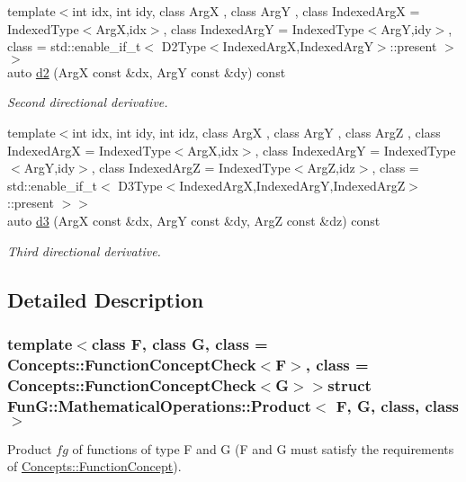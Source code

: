 \begin{DoxyCompactItemize}
{\footnotesize template$<$int idx, int idy, class Arg\-X , class Arg\-Y , class Indexed\-Arg\-X  = \-Indexed\-Type$<$\-Arg\-X,idx$>$, class Indexed\-Arg\-Y  = \-Indexed\-Type$<$\-Arg\-Y,idy$>$, class  = std\-::enable\-\_\-if\-\_\-t$<$ D2\-Type$<$\-Indexed\-Arg\-X,\-Indexed\-Arg\-Y$>$\-::present $>$$>$ }\\auto \hyperlink{structFunG_1_1MathematicalOperations_1_1Product_a91802ff95963324b5f36016ac5f8c5e0}{d2} (\-Arg\-X const \&dx, \-Arg\-Y const \&dy) const 
\begin{DoxyCompactList}\small\item\em \-Second directional derivative. \end{DoxyCompactList}\item 
{\footnotesize template$<$int idx, int idy, int idz, class Arg\-X , class Arg\-Y , class Arg\-Z , class Indexed\-Arg\-X  = \-Indexed\-Type$<$\-Arg\-X,idx$>$, class Indexed\-Arg\-Y  = \-Indexed\-Type$<$\-Arg\-Y,idy$>$, class Indexed\-Arg\-Z  = \-Indexed\-Type$<$\-Arg\-Z,idz$>$, class  = std\-::enable\-\_\-if\-\_\-t$<$ D3\-Type$<$\-Indexed\-Arg\-X,\-Indexed\-Arg\-Y,\-Indexed\-Arg\-Z$>$\-::present $>$$>$ }\\auto \hyperlink{structFunG_1_1MathematicalOperations_1_1Product_a1ba58e174ea3864a63a4158b95fc8db0}{d3} (\-Arg\-X const \&dx, \-Arg\-Y const \&dy, \-Arg\-Z const \&dz) const 
\begin{DoxyCompactList}\small\item\em \-Third directional derivative. \end{DoxyCompactList}\end{DoxyCompactItemize}


\subsection{\-Detailed \-Description}
\subsubsection*{template$<$class F, class G, class = \-Concepts\-::\-Function\-Concept\-Check$<$\-F$>$, class = \-Concepts\-::\-Function\-Concept\-Check$<$\-G$>$$>$struct Fun\-G\-::\-Mathematical\-Operations\-::\-Product$<$ F, G, class, class $>$}

\-Product $fg$ of functions of type \-F and \-G (\-F and \-G must satisfy the requirements of \hyperlink{structFunG_1_1Concepts_1_1FunctionConcept}{\-Concepts\-::\-Function\-Concept}). 

